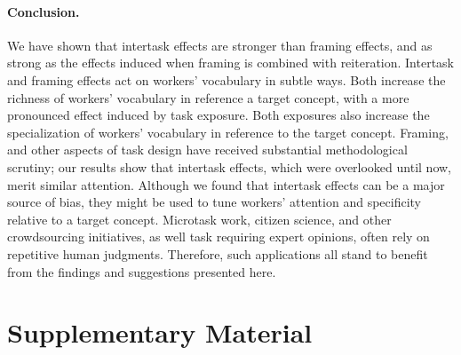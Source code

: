 \documentclass[12pt]{article}
\begin{document}
\paragraph{Conclusion.}
We have shown that intertask effects are stronger than framing effects, and
as strong as the effects induced when framing is combined with reiteration.
Intertask and framing effects act on workers' vocabulary in subtle ways.  
Both increase the richness of workers' vocabulary in reference a target
concept, with a more pronounced effect induced by task exposure.
Both exposures also increase the specialization of workers' vocabulary in 
reference to the target concept.  Framing, and other aspects of task design 
have received substantial methodological scrutiny; our results show that 
intertask effects, which were overlooked until now, merit similar 
attention.  Although we found that intertask effects can be a major 
source of bias, they might be used to tune workers' attention and 
specificity relative to
a target concept.  Microtask work, citizen science, and other crowdsourcing
initiatives, as well task requiring expert opinions, often rely on repetitive 
human judgments.  Therefore, such applications all stand to benefit from the 
findings and suggestions presented here.





\section*{Supplementary Material}
\end{document}
